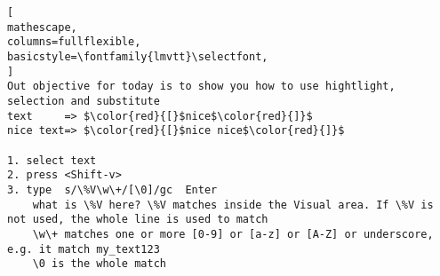 \documentclass[UTF8]{article}
\begin{document}
\begin{lstlisting}[
mathescape,
columns=fullflexible,
basicstyle=\fontfamily{lmvtt}\selectfont,
]
Out objective for today is to show you how to use hightlight, selection and substitute
text     => $\color{red}{[}$nice$\color{red}{]}$
nice text=> $\color{red}{[}$nice nice$\color{red}{]}$

1. select text
2. press <Shift-v>
3. type  s/\%V\w\+/[\0]/gc  Enter
    what is \%V here? \%V matches inside the Visual area. If \%V is not used, the whole line is used to match
    \w\+ matches one or more [0-9] or [a-z] or [A-Z] or underscore, e.g. it match my_text123 
    \0 is the whole match
\end{lstlisting} 
\end{document}
